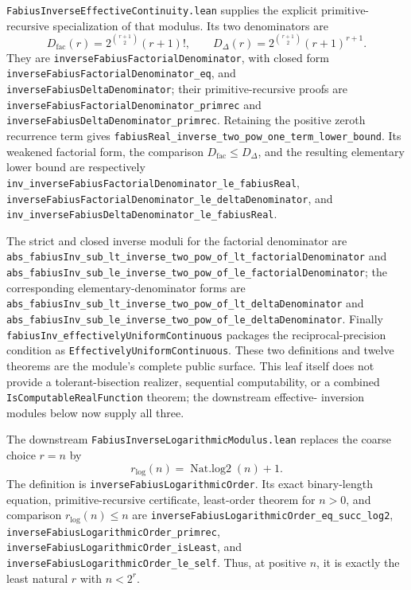 \documentclass[11pt,oneside]{article}
\theoremstyle{definition}
\theoremstyle{remark}
\begin{document}
\nolinkurl{FabiusInverseEffectiveContinuity.lean} supplies the explicit
primitive-recursive specialization of that modulus.  Its two denominators are
\[
 D_{\mathrm{fac}}(r)=2^{\binom{r+1}{2}}(r+1)!,\qquad
 D_{\Delta}(r)=2^{\binom{r+1}{2}}(r+1)^{r+1}.
\]
They are \nolinkurl{inverseFabiusFactorialDenominator}, with closed form
\nolinkurl{inverseFabiusFactorialDenominator_eq}, and
\nolinkurl{inverseFabiusDeltaDenominator}; their primitive-recursive proofs are
\nolinkurl{inverseFabiusFactorialDenominator_primrec} and
\nolinkurl{inverseFabiusDeltaDenominator_primrec}.  Retaining the positive
zeroth recurrence term gives
\nolinkurl{fabiusReal_inverse_two_pow_one_term_lower_bound}.  Its weakened
factorial form, the comparison \(D_{\mathrm{fac}}\le D_{\Delta}\), and the
resulting elementary lower bound are respectively
\nolinkurl{inv_inverseFabiusFactorialDenominator_le_fabiusReal},
\nolinkurl{inverseFabiusFactorialDenominator_le_deltaDenominator}, and
\nolinkurl{inv_inverseFabiusDeltaDenominator_le_fabiusReal}.

The strict and closed inverse moduli for the factorial denominator are
\nolinkurl{abs_fabiusInv_sub_lt_inverse_two_pow_of_lt_factorialDenominator}
and
\nolinkurl{abs_fabiusInv_sub_le_inverse_two_pow_of_le_factorialDenominator};
the corresponding elementary-denominator forms are
\nolinkurl{abs_fabiusInv_sub_lt_inverse_two_pow_of_lt_deltaDenominator} and
\nolinkurl{abs_fabiusInv_sub_le_inverse_two_pow_of_le_deltaDenominator}.
Finally \nolinkurl{fabiusInv_effectivelyUniformContinuous} packages the
reciprocal-precision condition as \nolinkurl{EffectivelyUniformContinuous}.
These two definitions and twelve theorems are the module's complete public
surface.  This leaf itself does not provide a tolerant-bisection realizer,
sequential computability, or a combined
\nolinkurl{IsComputableRealFunction} theorem; the downstream effective-
inversion modules below now supply all three.

The downstream \nolinkurl{FabiusInverseLogarithmicModulus.lean} replaces the
coarse choice \(r=n\) by
\[
 r_{\log}(n)=\operatorname{Nat.log2}(n)+1.
\]
The definition is \nolinkurl{inverseFabiusLogarithmicOrder}.  Its exact
binary-length equation, primitive-recursive certificate, least-order theorem
for \(n>0\), and comparison \(r_{\log}(n)\le n\) are
\nolinkurl{inverseFabiusLogarithmicOrder_eq_succ_log2},
\nolinkurl{inverseFabiusLogarithmicOrder_primrec},
\nolinkurl{inverseFabiusLogarithmicOrder_isLeast}, and
\nolinkurl{inverseFabiusLogarithmicOrder_le_self}.  Thus, at positive \(n\),
it is exactly the least natural \(r\) with \(n<2^r\).
\end{document}
